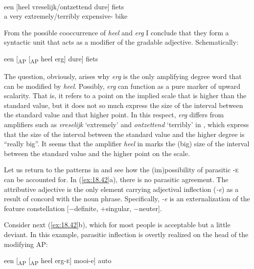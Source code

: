 \documentclass[output=paper]{langsci/langscibook}
\begin{document}
\ea%
    \label{ex:18.43}\\
    \gll \llap{*}een    [heel  vreselijk/ontzettend    dure]              fiets\\
        a            very    extremely/terribly  expensive-\Agr{}  bike\\
\z

From the possible cooccurrence of \emph{heel} and \emph{erg} I conclude that
they form a syntactic unit that acts as a modifier of the gradable adjective.
Schematically:

\ea%
    \label{ex:18.44}
    een [\textsubscript{AP} [\textsubscript{AP} heel erg] dure] fiets
\z

The question, obviously, arises why \emph{erg} is the only amplifying degree
word that can be modified by \emph{heel}. Possibly, \emph{erg} can function as
a pure marker of upward scalarity. That is, it refers to a point on the implied
scale that is higher than the standard value, but it does not so much express
the size of the interval between the standard value and that higher point. In
this respect, \emph{erg} differs from amplifiers such as \emph{vreselijk}
\enquote*{extremely} and \emph{ontzettend} \enquote*{terribly} in
, which express that the size of the interval between the
standard value and the higher degree is \enquote{really big}. It seems that the
amplifier \emph{heel} in  marks the (big) size of the interval
between the standard value and the higher point on the scale.

Let us return to the patterns in  and see how the
(im)possibility of parasitic \textsc{-e} can be accounted for. In
(\ref{ex:18.42}a), there is no parasitic agreement. The attributive adjective is
the only element carrying adjectival inflection (\emph{-e}) as a result of
concord with the noun phrase. Specifically, \emph{-e} is an externalization of
the feature constellation [−definite, +singular, −neuter].

Consider next (\ref{ex:18.42}b), which for most people is acceptable but a
little deviant. In this example, parasitic inflection is overtly realized on
the head of the modifying AP:

\ea%
    \label{ex:18.45}
    een [\textsubscript{AP} [\textsubscript{AP} heel erg-\textsc{e}] mooi\textsubscript{}-e] auto
\z
\end{document}

